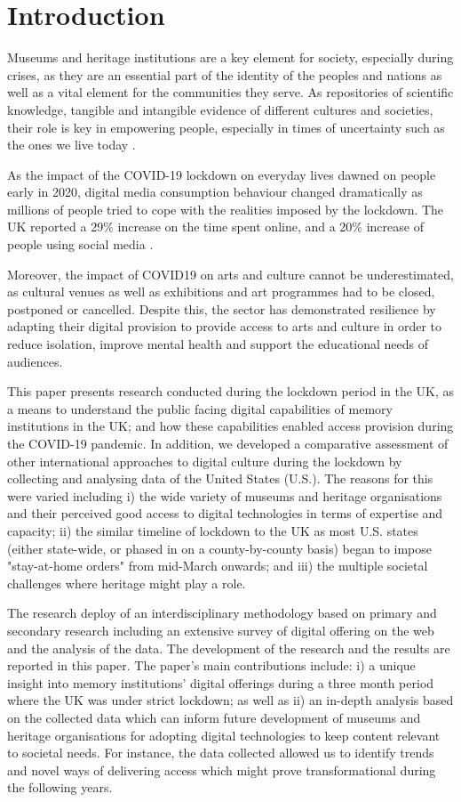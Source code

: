 \documentclass{egpubl}
\begin{document}
\section{Introduction}
Museums and heritage institutions are a key element for society, especially during crises, as they are an essential part of the identity of the peoples and nations as well as a vital element for the communities they serve. As repositories of scientific knowledge, tangible and intangible evidence of different cultures and societies, their role is key in empowering people, especially in times of uncertainty such as the ones we live today \cite{ICOM:2020}.

As the impact of the COVID-19 lockdown on everyday lives dawned on people early in 2020, digital media consumption behaviour changed dramatically as millions of people tried to cope with the realities imposed by the lockdown. The UK reported a 29\% increase on the time spent online, and a 20\% increase of people using social media \cite{ofcom:2020}. 

Moreover, the impact of COVID19 on arts and culture cannot be underestimated, as cultural venues as well as exhibitions and art programmes had to be closed, postponed or cancelled. Despite this, the sector has demonstrated resilience by adapting their digital provision to provide access to arts and culture in order to reduce isolation, improve mental health and support the educational needs of audiences.

This paper presents research conducted during the lockdown period in the UK, as a means to  understand the public facing digital capabilities of memory institutions in the UK; and how these capabilities enabled access provision during the COVID-19 pandemic. In addition, we developed a comparative assessment of  other international approaches to digital culture during the lockdown  by collecting and analysing data of the United States (U.S.). The reasons for this were varied including i) the wide variety of museums and heritage organisations and their perceived good access to digital technologies in terms of expertise and capacity; ii) the similar timeline of lockdown to the UK as most U.S. states (either state-wide, or phased in on a county-by-county basis) began to impose "stay-at-home orders" from mid-March onwards; and iii) the multiple societal challenges where heritage might play a role.

The research deploy of an interdisciplinary methodology based on primary and secondary research including an extensive survey of digital offering on the web and the analysis of  the data. The development of the research and the results are reported in this paper. The paper’s main contributions include: i) a unique insight into memory institutions’ digital offerings during a three month period where the UK was under strict lockdown; as well as ii) an in-depth analysis based on the collected data which can inform future development of museums and heritage organisations for adopting digital technologies to keep content relevant to societal needs. For instance, the data collected allowed us to identify trends and novel ways of delivering access which might prove transformational during the following years.
\end{document}
